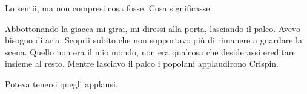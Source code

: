 Lo sentii, ma non compresi cosa fosse. Cosa significasse.

Abbottonando la giacca mi girai, mi diressi alla porta, lasciando il
palco. Avevo bisogno di aria. Scoprii subito che non sopportavo più di
rimanere a guardare la scena. Quello non era il mio mondo, non era
qualcosa che desiderassi ereditare insieme al resto. Mentre lasciavo il
palco i popolani applaudirono Crispin.

Poteva tenersi quegli applausi.